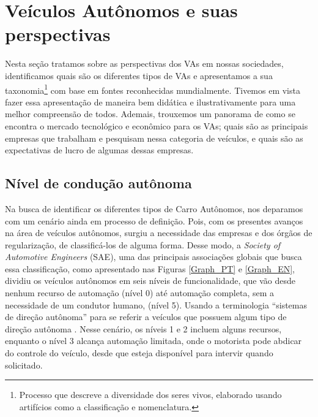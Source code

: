 \section{Veículos Autônomos e suas perspectivas}
Nesta seção tratamos sobre as perspectivas dos VAs em nossas sociedades, identificamos quais são os diferentes tipos de VAs e apresentamos a sua taxonomia\footnote{Processo que descreve a diversidade dos seres vivos, elaborado usando artifícios como a classificação e nomenclatura.} com base em fontes reconhecidas mundialmente. Tivemos em vista fazer essa apresentação de maneira bem didática e ilustrativamente para uma melhor compreensão de todos. Ademais, trouxemos um panorama de como se encontra o mercado tecnológico e econômico para os VAs; quais são as principais empresas que trabalham e pesquisam nessa categoria de veículos, e quais são as expectativas de lucro de algumas dessas empresas.

\subsection{Nível de condução autônoma}  \label{nv3}
Na busca de identificar os diferentes tipos de Carro Autônomos, nos deparamos com um cenário ainda em processo de definição. Pois, com os presentes avanços na área de veículos autônomos, surgiu a necessidade das empresas e dos órgãos de regularização, de classificá-los de alguma forma. Desse modo, a \textit{Society of Automotive Engineers} (SAE), uma das principais associações globais que busca essa classificação, como apresentado nas Figuras \ref{Graph_PT} e \ref{Graph_EN}, dividiu os veículos autônomos em seis níveis de funcionalidade, que vão desde nenhum recurso de automação (nível 0) até automação completa, sem a necessidade de um condutor humano, (nível 5). Usando a terminologia “sistemas de direção autônoma” para se referir a veículos que possuem algum tipo de direção autônoma \cite{SAE}. Nesse cenário, os níveis 1 e 2 incluem alguns recursos, enquanto o nível 3 alcança automação limitada, onde o motorista pode abdicar do controle do veículo, desde que esteja disponível para intervir quando solicitado.

